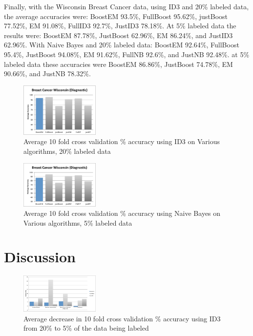 \documentclass{sig-alternate}
\begin{document}
Finally, with the Wisconsin Breast Cancer data, using ID3 and 20\% labeled data, the average accuracies were: BoostEM 93.5\%, FullBoost 95.62\%, justBoost 77.52\%, EM 91.08\%, FullID3 92.7\%, JustID3 78.18\%. At 5\% labeled data the results were: BoostEM 87.78\%, JustBoost 62.96\%, EM 86.24\%, and JustID3 62.96\%.
With Naive Bayes and 20\% labeled data: BoostEM 92.64\%, FullBoost 95.4\%, JustBoost 94.08\%, EM 91.62\%, FullNB 92.6\%, and JustNB 92.48\%. at 5\% labeled data these accuracies were BoostEM 86.86\%, JustBoost 74.78\%, EM 90.66\%, and JustNB 78.32\%.
\begin{figure}[ht!]
\centering
\includegraphics[width=0.35\textwidth]{figures/breaAcc.pdf}
\caption{Average 10 fold cross validation \% accuracy using ID3 on Various algorithms, 20\% labeled data}
\label{breaAcc}
\end{figure}
\begin{figure}[ht!]
\centering
\includegraphics[width=0.35\textwidth]{figures/breaAcc5.pdf}
\caption{Average 10 fold cross validation \% accuracy using Naive Bayes on Various algorithms, 5\% labeled data}
\label{breaAcc5}
\end{figure}
 

\section{Discussion}

\begin{figure}
\centering
\includegraphics[width=0.35\textwidth]{figures/accDrops.pdf}
\caption{Average decrease in 10 fold cross validation \% accuracy using ID3 from 20\% to 5\% of the data being labeled}
\label{accDrop}
\end{figure}
\end{document}
